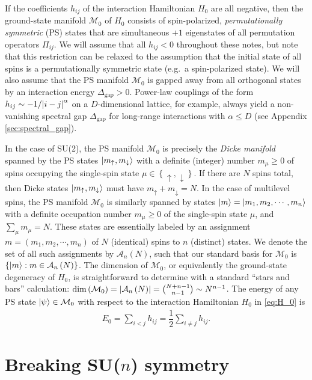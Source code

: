 \documentclass[nofootinbib,notitlepage,11pt]{revtex4-2}
\renewcommand{\t}{\text} %
\newcommand{\f}[2]{\dfrac{#1}{#2}} %
\newcommand{\p}[1]{\left(#1\right)} %
\renewcommand{\set}[1]{\left\{#1\right\}} %
\newcommand{\1}{\mathds{1}}
\newcommand{\up}{\uparrow}
\newcommand{\dn}{\downarrow}
\newcommand{\A}{\mathcal{A}}
\newcommand{\M}{\mathcal{M}}
\begin{document}
If the coefficients $h_{ij}$ of the interaction Hamiltonian $H_0$ are
all negative, then the ground-state manifold $\M_0$ of $H_0$ consists
of spin-polarized, {\it permutationally symmetric} (PS) states that
are simultaneous $+1$ eigenstates of all permutation operators
$\Pi_{ij}$.  We will assume that all $h_{ij}<0$ throughout these
notes, but note that this restriction can be relaxed to the assumption
that the initial state of all spins is a permutationally symmetric
state (e.g.~a spin-polarized state).  We will also assume that the PS
manifold $\M_0$ is gapped away from all orthogonal states by an
interaction energy $\Delta_{\t{gap}}>0$.  Power-law couplings of the
form $h_{ij}\sim-1/\abs{i-j}^\alpha$ on a $D$-dimensional lattice, for
example, always yield a non-vanishing spectral gap $\Delta_{\t{gap}}$
for long-range interactions with $\alpha\le D$ (see Appendix
\ref{sec:spectral_gap}).

In the case of SU(2), the PS manifold $\M_0$ is precisely the {\it
  Dicke manifold} spanned by the PS states $\ket{m_\up,m_\dn}$ with a
definite (integer) number $m_\mu\ge0$ of spins occupying the
single-spin state $\mu\in\set{\up,\dn}$.  If there are $N$ spins
total, then Dicke states $\ket{m_\up,m_\dn}$ must have
$m_\up+m_\dn=N$.  In the case of multilevel spins, the PS manifold
$\M_0$ is similarly spanned by states
$\ket{m}=\ket{m_1,m_2,\cdots,m_n}$ with a definite occupation number
$m_\mu\ge0$ of the single-spin state $\mu$, and $\sum_\mu m_\mu=N$.
These states are essentially labeled by an assignment
$m=\p{m_1,m_2,\cdots,m_n}$ of $N$ (identical) spins to $n$ (distinct)
states.  We denote the set of all such assignments by $\A_n\p{N}$,
such that our standard basis for $\M_0$ is
$\set{\ket{m}:m\in\A_n\p{N}}$.  The dimension of $\M_0$, or
equivalently the ground-state degeneracy of $H_0$, is straightforward
to determine with a standard ``stars and bars'' calculation:
$\dim\p{\M_0}=\abs{\A_n\p{N}} = {N+n-1 \choose n-1} \sim N^{n-1}$.
The energy of any PS state $\ket\psi\in\M_0$ with respect to the
interaction Hamiltonian $H_0$ in \eqref{eq:H_0} is
\begin{align}
  E_0 = \sum_{i<j} h_{ij} = \f12 \sum_{i\ne j} h_{ij}.
\end{align}

\section{Breaking SU($n$) symmetry}
\label{sec:breaking_sun}
\end{document}
